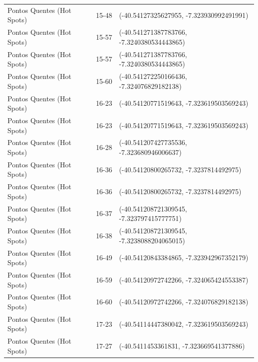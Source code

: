 \documentclass[dvipsnames]{article}%
\begin{document}
\begin{table}[h!]
\begin{tabular}{lll}
Pontos Quentes (Hot Spots)&15{-}48&({-}40.54127325627955, {-}7.323930992491991)\\%
Pontos Quentes (Hot Spots)&15{-}57&({-}40.541271387783766, {-}7.3240380534443865)\\%
Pontos Quentes (Hot Spots)&15{-}57&({-}40.541271387783766, {-}7.3240380534443865)\\%
Pontos Quentes (Hot Spots)&15{-}60&({-}40.541272250166436, {-}7.324076829182138)\\%
Pontos Quentes (Hot Spots)&16{-}23&({-}40.54120771519643, {-}7.323619503569243)\\%
Pontos Quentes (Hot Spots)&16{-}23&({-}40.54120771519643, {-}7.323619503569243)\\%
Pontos Quentes (Hot Spots)&16{-}28&({-}40.541207427735536, {-}7.323680946006637)\\%
Pontos Quentes (Hot Spots)&16{-}36&({-}40.54120800265732, {-}7.3237814492975)\\%
Pontos Quentes (Hot Spots)&16{-}36&({-}40.54120800265732, {-}7.3237814492975)\\%
Pontos Quentes (Hot Spots)&16{-}37&({-}40.541208721309545, {-}7.323797415777751)\\%
Pontos Quentes (Hot Spots)&16{-}38&({-}40.541208721309545, {-}7.3238088204065015)\\%
Pontos Quentes (Hot Spots)&16{-}49&({-}40.54120843384865, {-}7.323942967352179)\\%
Pontos Quentes (Hot Spots)&16{-}59&({-}40.54120972742266, {-}7.324065424553387)\\%
Pontos Quentes (Hot Spots)&16{-}60&({-}40.54120972742266, {-}7.324076829182138)\\%
Pontos Quentes (Hot Spots)&17{-}23&({-}40.54114447380042, {-}7.323619503569243)\\%
Pontos Quentes (Hot Spots)&17{-}27&({-}40.5411453361831, {-}7.323669541377886)\\%
\bottomrule%
\end{tabular}%
\end{table}

%
\FloatBarrier%
\end{document}

